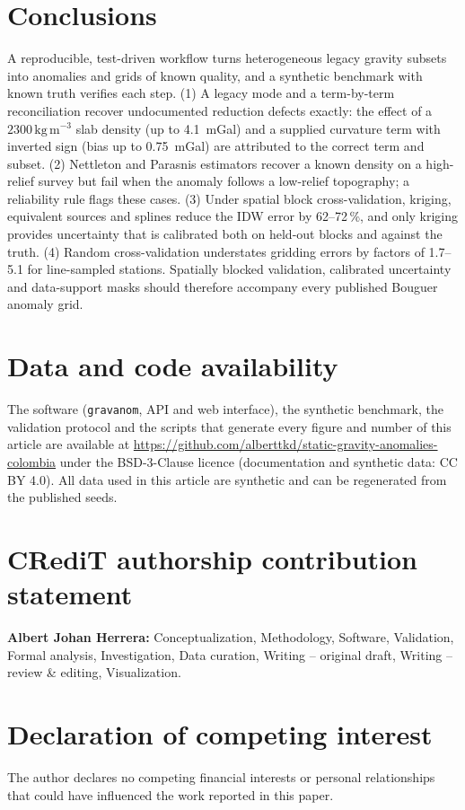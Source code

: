 \documentclass[11pt,a4paper]{article}
\newcommand{\kgm}{\ensuremath{\,\mathrm{kg\,m^{-3}}}}
\begin{document}
\section{Conclusions}

A reproducible, test-driven workflow turns heterogeneous legacy gravity subsets into anomalies and grids of known quality, and a synthetic benchmark with known truth verifies each step. (1) A legacy mode and a term-by-term reconciliation recover undocumented reduction defects exactly: the effect of a $2300\kgm$ slab density (up to \SI{4.1}{mGal}) and a supplied curvature term with inverted sign (bias up to \SI{0.75}{mGal}) are attributed to the correct term and subset. (2) Nettleton and Parasnis estimators recover a known density on a high-relief survey but fail when the anomaly follows a low-relief topography; a reliability rule flags these cases. (3) Under spatial block cross-validation, kriging, equivalent sources and splines reduce the IDW error by 62--72\,\%, and only kriging provides uncertainty that is calibrated both on held-out blocks and against the truth. (4) Random cross-validation understates gridding errors by factors of 1.7--5.1 for line-sampled stations. Spatially blocked validation, calibrated uncertainty and data-support masks should therefore accompany every published Bouguer anomaly grid.

\section*{Data and code availability}
The software (\texttt{gravanom}, API and web interface), the synthetic benchmark, the validation protocol and the scripts that generate every figure and number of this article are available at \url{https://github.com/alberttkd/static-gravity-anomalies-colombia} under the BSD-3-Clause licence (documentation and synthetic data: CC BY 4.0). All data used in this article are synthetic and can be regenerated from the published seeds.

\section*{CRediT authorship contribution statement}
\textbf{Albert Johan Herrera:} Conceptualization, Methodology, Software, Validation, Formal analysis, Investigation, Data curation, Writing -- original draft, Writing -- review \& editing, Visualization.

\section*{Declaration of competing interest}
The author declares no competing financial interests or personal relationships that could have influenced the work reported in this paper.
\end{document}
